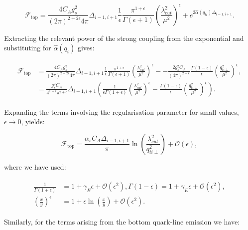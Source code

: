 		\begin{equation}
			\mathcal{F}_{\text{top}} = \frac{4C_Ag_s^2}{(2\pi)^{2+2\epsilon}4\pi}\Delta_{i-1, i+1}
			\frac{1}{\epsilon}\frac{\pi^{1+\epsilon}}
			{\Gamma(\epsilon+1)}\left(\frac{\lambda_{cut}^2}{\mu^2}\right)^\epsilon +
			e^{2\hat{\alpha}(q_{ti})\Delta_{i-1,i+1}}.
		\end{equation}

		Extracting the relevant power of the strong coupling from the
		exponential and substituting for $\hat{\alpha}(q_i)$ gives:

		\begin{align}
		\begin{split}
			\mathcal{F}_{\text{top}} &= \frac{4C_Ag_s^2}{(2\pi)^{2+2\epsilon}4\pi}\Delta_{i-1, i+1}\frac{1}{\epsilon}\frac{\pi^{1+\epsilon}}
			{\Gamma(\epsilon+1)}\left(\frac{\lambda_{cut}^2}{\mu^2}\right)^\epsilon - -\frac{2g_s^2C_A}{(4\pi)^{2+\epsilon}}
			\frac{\Gamma(1-\epsilon)}{\epsilon}\left(\frac{q_{ti\perp}^2}{\mu^2}\right)^\epsilon, \\
			&= \frac{g_s^2C_A}{4^{1+\epsilon}\pi^{2+\epsilon}}\Delta_{i-1, i+1}\left(\frac{1}{\epsilon\Gamma(1+\epsilon)}
			\left(\frac{\lambda_{cut}^2}{\mu^2}\right)^\epsilon - \frac{\Gamma(1-\epsilon)}{\epsilon}
			\left(\frac{q_{ti\perp}^2}{\mu^2}\right)^\epsilon\right).
		\end{split}
		\end{align}

		Expanding the terms involving the regularisation parameter for small values,
		$\epsilon\to0$, yields:

		\begin{equation}
			\mathcal{F}_{\text{top}} = \frac{\alpha_sC_A\Delta_{i-1, i+1}}{\pi}
			\ln\left(\frac{\lambda_{cut}^2}{q_{ti\perp}^2}\right) + \mathcal{O}(\epsilon),
		\end{equation}

		where we have used:

		\begin{align}
		\begin{split}
			\frac{1}{\Gamma(1+\epsilon)} &= 1 + \gamma_E\epsilon + \mathcal{O}(\epsilon^2),
			\Gamma(1-\epsilon) = 1 + \gamma_E\epsilon + \mathcal{O}(\epsilon^2),\\
			\left(\frac{x}{y}\right)^\epsilon &= 1 + \epsilon\ln\left(\frac{x}{y}\right) +
			\mathcal{O}(\epsilon^2).
		\end{split}
		\end{align}

		Similarly, for the terms arising from the bottom quark-line emission we have:

